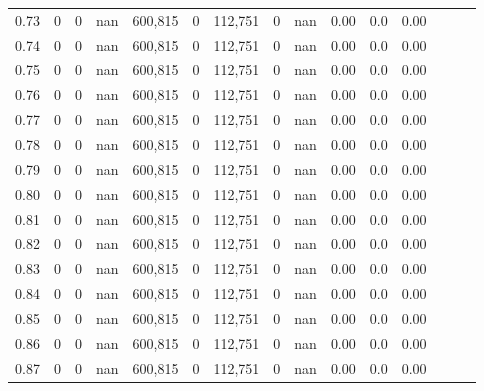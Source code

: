\begin{tabular}{rrrrrrrrrrrrrrr}
0.73 &        0 &       0 &   nan &  600,815 &        0 &  112,751 &        0 &   nan &  0.00 &                     0.0 &      0.00 \\
0.74 &        0 &       0 &   nan &  600,815 &        0 &  112,751 &        0 &   nan &  0.00 &                     0.0 &      0.00 \\
0.75 &        0 &       0 &   nan &  600,815 &        0 &  112,751 &        0 &   nan &  0.00 &                     0.0 &      0.00 \\
0.76 &        0 &       0 &   nan &  600,815 &        0 &  112,751 &        0 &   nan &  0.00 &                     0.0 &      0.00 \\
0.77 &        0 &       0 &   nan &  600,815 &        0 &  112,751 &        0 &   nan &  0.00 &                     0.0 &      0.00 \\
0.78 &        0 &       0 &   nan &  600,815 &        0 &  112,751 &        0 &   nan &  0.00 &                     0.0 &      0.00 \\
0.79 &        0 &       0 &   nan &  600,815 &        0 &  112,751 &        0 &   nan &  0.00 &                     0.0 &      0.00 \\
0.80 &        0 &       0 &   nan &  600,815 &        0 &  112,751 &        0 &   nan &  0.00 &                     0.0 &      0.00 \\
0.81 &        0 &       0 &   nan &  600,815 &        0 &  112,751 &        0 &   nan &  0.00 &                     0.0 &      0.00 \\
0.82 &        0 &       0 &   nan &  600,815 &        0 &  112,751 &        0 &   nan &  0.00 &                     0.0 &      0.00 \\
0.83 &        0 &       0 &   nan &  600,815 &        0 &  112,751 &        0 &   nan &  0.00 &                     0.0 &      0.00 \\
0.84 &        0 &       0 &   nan &  600,815 &        0 &  112,751 &        0 &   nan &  0.00 &                     0.0 &      0.00 \\
0.85 &        0 &       0 &   nan &  600,815 &        0 &  112,751 &        0 &   nan &  0.00 &                     0.0 &      0.00 \\
0.86 &        0 &       0 &   nan &  600,815 &        0 &  112,751 &        0 &   nan &  0.00 &                     0.0 &      0.00 \\
0.87 &        0 &       0 &   nan &  600,815 &        0 &  112,751 &        0 &   nan &  0.00 &                     0.0 &      0.00 \\

\end{tabular}
